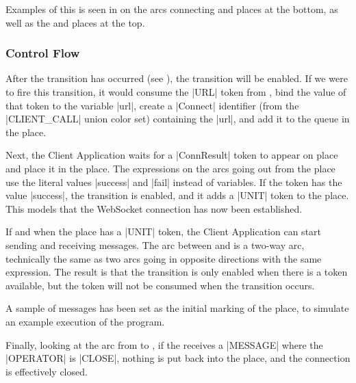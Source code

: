 		Examples of this is seen in  on the arcs connecting
		 and  places at the bottom, as well as the
		 and  places at the top.

	\subsubsection{Control Flow}
	
		After the  transition has occurred (see ),
		the  transition will be enabled. If we were to fire this
		transition, it would consume the |URL| token from , bind
		the value of that token to the variable |url|, create a |Connect| identifier
		(from the |CLIENT_CALL| union color set) containing the |url|, and add it to
		the queue in the  place.
		
		Next, the Client Application waits for a |ConnResult| token to appear on
		place  and place it in the 
		place. The expressions on the arcs going out from the 
		place use the literal values |success| and |fail| instead of variables. If  the token has
		the value |success|, the  transition is enabled, and it
		adds a |UNIT| token to the  place. This models
		that the WebSocket connection has now been established.
		
		If and when the  place has a |UNIT| token, the
		Client Application can start sending and receiving messages. The arc between
		 and  is a two-way arc,
		technically the same as two arcs going in opposite directions with the same
		expression.
		The result is that the transition is only enabled when there is a token
		available, but the token will not be consumed when the transition occurs. 
		
		A sample of messages has been set as the initial marking of the
		 place, to simulate an example execution of the program.
		
		Finally, looking at the arc from  to , if the  receives a |MESSAGE| where
		the |OPERATOR| is |CLOSE|, nothing is put back into the  place, and the connection is effectively closed.

